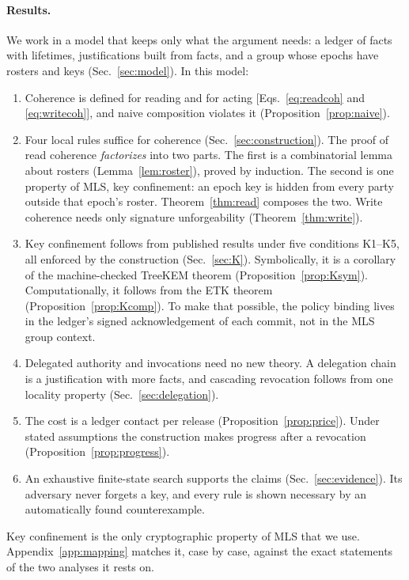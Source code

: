\documentclass[aps,prx,reprint,superscriptaddress,nofootinbib,floatfix]{revtex4-2}
\theoremstyle{remark}
\begin{document}
\paragraph*{Results.} We work in a model that keeps only what the argument needs: a ledger of facts with lifetimes, justifications built from facts, and a group whose epochs have rosters and keys (Sec.~\ref{sec:model}). In this model:
\begin{enumerate}
\item Coherence is defined for reading and for acting [Eqs.~\eqref{eq:readcoh} and \eqref{eq:writecoh}], and naive composition violates it (Proposition~\ref{prop:naive}).
\item Four local rules suffice for coherence (Sec.~\ref{sec:construction}). The proof of read coherence \emph{factorizes} into two parts. The first is a combinatorial lemma about rosters (Lemma~\ref{lem:roster}), proved by induction. The second is one property of MLS, key confinement: an epoch key is hidden from every party outside that epoch's roster. Theorem~\ref{thm:read} composes the two. Write coherence needs only signature unforgeability (Theorem~\ref{thm:write}).
\item Key confinement follows from published results under five conditions K1--K5, all enforced by the construction (Sec.~\ref{sec:K}). Symbolically, it is a corollary of the machine-checked TreeKEM theorem (Proposition~\ref{prop:Ksym}). Computationally, it follows from the ETK theorem (Proposition~\ref{prop:Kcomp}). To make that possible, the policy binding lives in the ledger's signed acknowledgement of each commit, not in the MLS group context.
\item Delegated authority and invocations need no new theory. A delegation chain is a justification with more facts, and cascading revocation follows from one locality property (Sec.~\ref{sec:delegation}).
\item The cost is a ledger contact per release (Proposition~\ref{prop:price}). Under stated assumptions the construction makes progress after a revocation (Proposition~\ref{prop:progress}).
\item An exhaustive finite-state search supports the claims (Sec.~\ref{sec:evidence}). Its adversary never forgets a key, and every rule is shown necessary by an automatically found counterexample.
\end{enumerate}
Key confinement is the only cryptographic property of MLS that we use. Appendix~\ref{app:mapping} matches it, case by case, against the exact statements of the two analyses it rests on.
\end{document}
